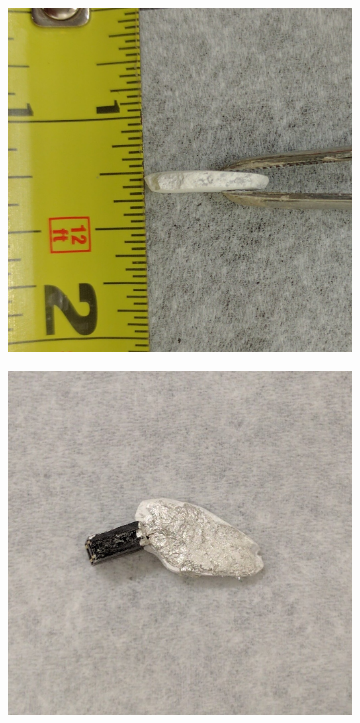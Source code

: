 \documentclass[%
 reprint,
 amsmath,amssymb,
 aps,
 pra,
]{revtex4-1}
\begin{document}
\begin{figure}[H]
\begin{subfigure}{0.22\textwidth}
		\includegraphics[width=\textwidth,angle=90]{sample_thickness.jpg} 
		\caption{}
		\label{fig:sample:thickness}
	\end{subfigure}
	\begin{subfigure}{0.22\textwidth}
		\includegraphics[width=\textwidth]{sample_complete.jpg}

\end{subfigure}
\end{figure}
\end{document}
